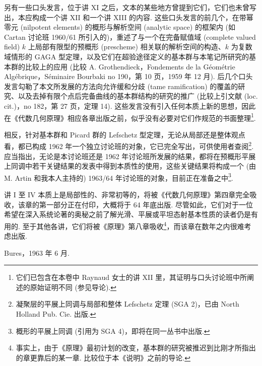 另有一些口头发言，位于讲 XI 之后，文本的某些地方曾提到它们，它们也未曾写出，本应构成一个讲 XII 和一个讲 XIII 的内容. 这些口头发言的前几个，在带幂零元 (nilpotent elements) 的概形与解析空间 (analytic space) 的框架内 (如 Cartan 讨论班 1960/61 所引入的)，重述了与一个在完备赋值域 (complete valued field) $k$ 上局部有限型的预概形 (prescheme) 相关联的解析空间的构造、$k$ 为复数域情形的 GAGA 型定理，以及它们在超验途径定义的基本群与本笔记所研究的基本群的比较上的应用 (比较 A. Grothendieck，Fondements de la Géométrie Algébrique，Séminaire Bourbaki no 190，第 10 页，1959 年 12 月). 后几个口头发言勾勒了本文所发展的方法向允许缓和分歧 (tame ramification) 的覆盖的研究、以及去掉有限个点后完备曲线的基本群结构的研究的推广 (比较上引文献 (loc. cit.)，no 182，第 27 页，定理 14). 这些发言没有引入任何本质上新的思想，因此在《代数几何原理》相应各章出版之前，似乎没有必要对它们作规范的书面整理\footnote{它们已包含在本卷中 Raynaud 女士的讲 XII 里，其证明与口头讨论班中所阐述的原始证明不同 (参见导论).}.

相反，针对基本群和 Picard 群的 Lefschetz 型定理，无论从局部还是整体观点看，都已构成 1962 年一个独立讨论班的对象，它已完全写出，可供使用者查阅\footnote{凝聚层的平展上同调与局部和整体 Lefschetz 定理 (SGA 2)，已由 North Holland Pub. Cie. 出版.}. 应当指出，无论是本讨论班还是 1962 年讨论班所发展的结果，都将在预概形平展上同调中若干关键结果的发表中得到本质性的使用，这些关键结果将构成一个 (由 M. Artin 和我本人主持的) 1963/64 年讨论班的对象，目前正在准备之中\footnote{概形的平展上同调 (引用为 SGA 4)，即将在同一丛书中出版.}.

讲 I 至 IV 本质上是局部性的、非常初等的，将被《代数几何原理》第四章完全吸收，该章的第一部分正在付印，大概将于 64 年底出版. 尽管如此，它们对于一位希望在深入系统论著的奥秘之前了解光滑、平展或平坦态射基本性质的读者仍是有用的. 至于其他各讲，它们将被《原理》第八章吸收\footnote{事实上，由于《原理》最初计划的改变，基本群的研究被推迟到比刚才所指出的章更靠后的某一章. 比较位于本《说明》之前的导论.}，而该章在数年之内很难考虑出版.

\begin{flushright}
Bures，1963 年 6 月.
\end{flushright}

\cleardoublepage
